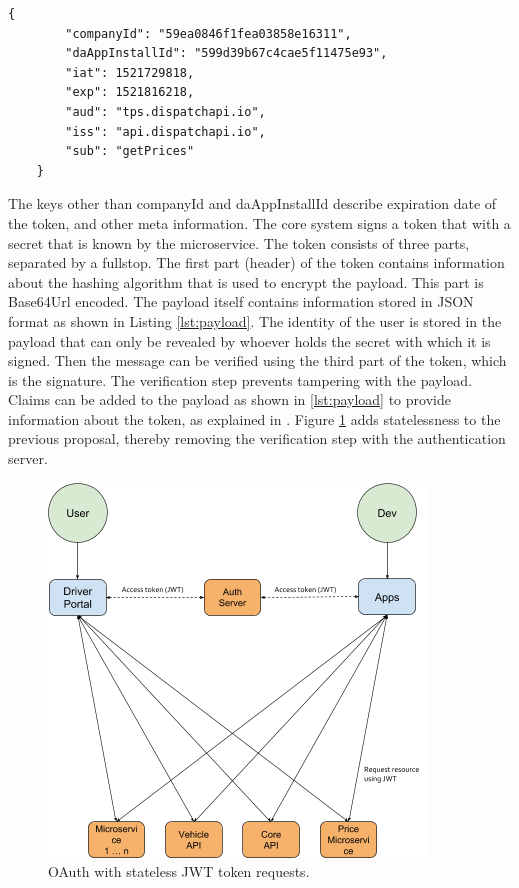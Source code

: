 \begin{lstlisting}[caption={Two user identifiers and registered claim names stored inside the payload of a JSON web token.}, label={lst:payload}]
	{
		"companyId": "59ea0846f1fea03858e16311",
		"daAppInstallId": "599d39b67c4cae5f11475e93",
		"iat": 1521729818,
		"exp": 1521816218,
		"aud": "tps.dispatchapi.io",
		"iss": "api.dispatchapi.io",
		"sub": "getPrices"
	}
\end{lstlisting}

The keys other than companyId and daAppInstallId describe expiration date of the token, and other meta information. The core system signs a token that with a secret that is known by the microservice. The token consists of three parts, separated by a fullstop. The first part (header) of the token contains information about the hashing algorithm that is used to encrypt the payload. This part is Base64Url encoded. The payload itself contains information stored in JSON format as shown in Listing \ref{lst:payload}. The identity of the user is stored in the payload that can only be revealed by whoever holds the secret with which it is signed. Then the message can be verified using the third part of the token, which is the signature. The verification step prevents tampering with the payload. Claims can be added to the payload as shown in \ref{lst:payload} to provide information about the token, as explained in \cite{JWT}. Figure \ref{fig:Auth2} adds statelessness to the previous proposal, thereby removing the verification step with the authentication server.

\begin{figure}[H]
	\centering
	\includegraphics[width=.7\textwidth]{Auth2}
	\caption[Stateless JWT]{OAuth with stateless JWT token requests.}
	\label{fig:Auth2}
\end{figure}

